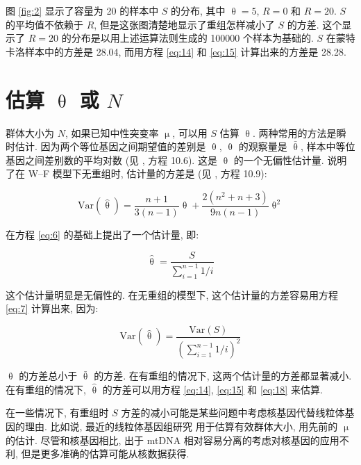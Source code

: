 \documentclass[12pt]{article}
\begin{document}
图 \ref{fig:2} 显示了容量为 20 的样本中 $S$ 的分布, 其中 $\uptheta =5$, $R=0$ 和 $R=20$. $S$ 的平均值不依赖于
$R$, 但是这张图清楚地显示了重组怎样减小了 $S$ 的方差. 这个显示了 $R=20$ 的分布是以用上述运算法则生成的 100000
个样本为基础的. $S$ 在蒙特卡洛样本中的方差是 28.04, 而用方程 \ref{eq:14} 和 \ref{eq:15} 计算出来的方差是 28.28.

\section{估算 $\uptheta$ 或 $N$}

群体大小为 $N$, 如果已知中性突变率 $\upmu$, 可以用 $S$ 估算 $\uptheta$. 两种常用的方法是瞬时估计.
因为两个等位基因之间期望值的差别是 $\uptheta$, $\uptheta$ 的观察量是 $\overset{‾}{\uptheta}$,
样本中等位基因之间差别数的平均对数 (见 \textcite{nei1987molecular}, 方程 10.6). 这是 $\uptheta$ 的一个无偏性估计量. \textcite{tajima1983} 说明了在
W--F 模型下无重组时, 估计量的方差是 (见 \textcite{nei1987molecular}, 方程 10.9):

\begin{equation} \label{eq:16}
    \text{Var}(\hat{\uptheta})=\frac{n+1}{3(n-1)}\uptheta + \frac{2(n^{2}+n+3)}{9n(n-1)}\uptheta^{2}
\end{equation}

\textcite{watterson1975} 在方程 \ref{eq:6} 的基础上提出了一个估计量, 即:

\begin{equation} \label{eq:17}
    \hat{\uptheta}=\frac{S}{\sum_{i=1}^{n-1}1/i}
\end{equation}

这个估计量明显是无偏性的. 在无重组的模型下, 这个估计量的方差容易用方程 \ref{eq:7} 计算出来, 因为:

\begin{equation} \label{eq:18}
    \text{Var}(\hat{\uptheta})=\frac{\text{Var}(S)}{\left( \sum_{i=1}^{n-1} 1/i \right)^{2}}
\end{equation}

$\uptheta$ 的方差总小于 $\overset{‾}{\uptheta}$ 的方差. 在有重组的情况下, 这两个估计量的方差都显著减小.
在有重组的情况下, $\hat{\uptheta}$ 的方差可以用方程 \ref{eq:14}, \ref{eq:15} 和 \ref{eq:18} 来估算.

在一些情况下, 有重组时 $S$ 方差的减小可能是某些问题中考虑核基因代替线粒体基因的理由.
比如说, 最近的线粒体基因组研究 \parencite{avise1987} 用于估算有效群体大小, 用先前的 $\upmu$ 的估计.
尽管和核基因相比, 出于 mtDNA 相对容易分离的考虑对核基因的应用不利, 但是更多准确的估算可能从核数据获得.
\end{document}
